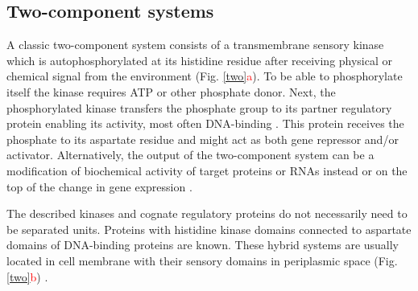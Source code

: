 \subsection{Two-component systems}
A classic two-component system consists of a transmembrane sensory kinase which is autophosphorylated at its histidine residue after receiving physical or chemical signal from the environment (Fig. \ref{two}\textcolor{red}{a}).
To be able to phosphorylate itself the kinase requires ATP or other phosphate donor.
Next, the phosphorylated kinase transfers the phosphate group to its partner regulatory protein enabling its activity, most often DNA-binding \cite{lynch2012prioritization, gao2015temporal, cui2018novel}.
This protein receives the phosphate to its aspartate residue and might act as both gene repressor and/or activator.
Alternatively, the output of the two-component system can be a modification of biochemical activity of target proteins or RNAs instead or on the top of the change in gene expression \cite{shu2002antar, chambonnier2016hybrid}.

The described kinases and cognate regulatory proteins do not necessarily need to be separated units.
Proteins with histidine kinase domains connected to aspartate domains of DNA-binding proteins are known.
These hybrid systems are usually located in cell membrane with their sensory domains in periplasmic space (Fig. \ref{two}\textcolor{red}{b}) \cite{lynch2012prioritization, hirano2013regulon}.


